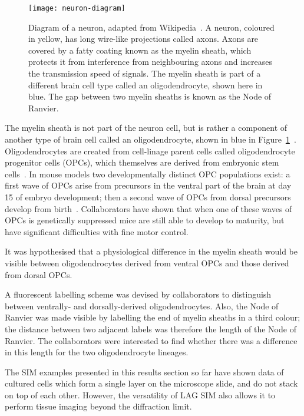 \begin{figure}[htbp!]
\centering
\texttt{[image: neuron-diagram]}
\caption[LAG SIM: Diagram of a neuron showing an axon protected by the myelin sheath]{Diagram of a neuron, adapted from Wikipedia~\cite{wikineuron}. A neuron, coloured in yellow, has long wire-like projections called axons. Axons are covered by a fatty coating known as the myelin sheath, which protects it from interference from neighbouring axons and increases the transmission speed of signals. The myelin sheath is part of a different brain cell type called an oligodendrocyte, shown here in blue. The gap between two myelin sheaths is known as the Node of Ranvier. }
\label{fig:neuron-diagram}
\end{figure}
\afterpage{\clearpage}

The myelin sheath is not part of the neuron cell, but is rather a component of another type of brain cell called an oligodendrocyte, shown in blue in Figure~\ref{fig:neuron-diagram}~\cite{hammond2012cellular}.
Oligodendrocytes are created from cell-linage parent cells called oligodendrocyte progenitor cells (OPCs), which themselves are derived from embryonic stem cells~\cite{goldman2015make}.
In mouse models two developmentally distinct OPC populations exist: a first wave of OPCs arise from precursors in the ventral part of the brain at day 15 of embryo development; then a second wave of OPCs from dorsal precursors develop from birth~\cite{kessaris2006competing}.
Collaborators have shown that when one of these waves of OPCs is genetically suppressed mice are still able to develop to maturity, but have significant difficulties with fine motor control.

It was hypothesised that a physiological difference in the myelin sheath would be visible between oligodendrocytes derived from ventral OPCs and those derived from dorsal OPCs.

A fluorescent labelling scheme was devised by collaborators to distinguish between ventrally- and dorsally-derived oligodendrocytes.
Also, the Node of Ranvier was made visible by labelling the end of myelin sheaths in a third colour; the distance between two adjacent labels was therefore the length of the Node of Ranvier.
The collaborators were interested to find whether there was a difference in this length for the two oligodendrocyte lineages.

The SIM examples presented in this results section so far have shown data of cultured cells which form a single layer on the microscope slide, and do not stack on top of each other.
However, the versatility of LAG SIM also allows it to perform tissue imaging beyond the diffraction limit.

